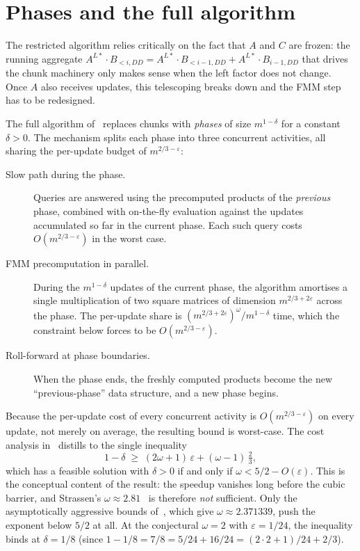 \documentclass[sigconf,nonacm]{acmart}
\theoremstyle{plain}
\theoremstyle{definition}
\begin{document}
\section{Phases and the full algorithm}
\label{sec:phases}
The restricted algorithm relies critically on the fact that $A$
and $C$ are frozen: the running aggregate
$A^{L*}\!\cdot B_{<i,DD} = A^{L*}\!\cdot B_{<i-1,DD}
+ A^{L*}\!\cdot B_{i-1,DD}$ that drives the chunk machinery only
makes sense when the left factor does not change. Once $A$ also
receives updates, this telescoping breaks down and the FMM step has
to be redesigned.

The full algorithm of~\cite{AssadiShah25} replaces chunks with
\emph{phases} of size $m^{1-\delta}$ for a constant $\delta>0$.
The mechanism splits each phase into three concurrent activities,
all sharing the per-update budget of $m^{2/3-\varepsilon}$:
\begin{description}
  \item[Slow path during the phase.] Queries are answered using the
        precomputed products of the \emph{previous} phase, combined
        with on-the-fly evaluation against the updates accumulated
        so far in the current phase. Each such query costs
        $O(m^{2/3-\varepsilon})$ in the worst case.
  \item[FMM precomputation in parallel.] During the
        $m^{1-\delta}$ updates of the current phase, the algorithm
        amortises a single multiplication of two square matrices of
        dimension $m^{2/3+2\varepsilon}$ across the phase. The
        per-update share is $(m^{2/3+2\varepsilon})^\omega /
        m^{1-\delta}$ time, which the constraint below forces to be
        $O(m^{2/3-\varepsilon})$.
  \item[Roll-forward at phase boundaries.] When the phase ends, the
        freshly computed products become the new ``previous-phase''
        data structure, and a new phase begins.
\end{description}
Because the per-update cost of every concurrent activity is
$O(m^{2/3-\varepsilon})$ on every update, not merely on
average, the resulting bound is worst-case. The cost analysis
in~\cite[\S4]{AssadiShah25} distills to the single inequality
\[
1 - \delta \;\ge\; (2\omega+1)\,\varepsilon + (\omega-1)\,\tfrac{2}{3},
\]
which has a feasible solution with $\delta>0$ if and only if
$\omega < 5/2 - O(\varepsilon)$. This is the conceptual content of
the result: the speedup vanishes long before the cubic barrier,
and Strassen's $\omega \approx 2.81$~\cite{Strassen69} is therefore
\emph{not} sufficient. Only the asymptotically aggressive bounds
of~\cite{ADW25}, which give $\omega \approx 2.371339$, push the
exponent below $5/2$ at all. At the conjectural $\omega = 2$ with
$\varepsilon = 1/24$, the inequality binds at $\delta = 1/8$
(since $1 - 1/8 = 7/8 = 5/24 + 16/24 = (2 \cdot 2 + 1)/24 + 2/3$).
\end{document}
